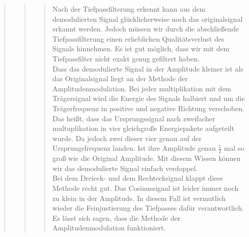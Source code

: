 \begin{quote}
\begin{quote}
\begin{quote}
                    Nach der Tiefpassfilterung erkennt kann aus dem demodulierten Signal glücklicherweise noch das
                    originalsignal erkannt werden. Jedoch müssen wir durch die abschließende Tiefpassfilterung einen
                    erheblichen Qualitätsverlust des Signals hinnehmen. Es ist gut möglich, dass wir mit dem
                    Tiefpassfilter nicht exakt genug gefiltert haben.\\
                    Dass das demodulierte Signal in der Amplitude kleiner ist als das Originalsignal liegt an der
                    Methode der Amplitudenmodulation. Bei jeder multiplikation mit dem Trägersignal wird die Energie des
                    Signals halbiert und um die Trägerfrequenz in positive und negative Richtung verschoben. Das heißt,
                    dass das Ursprungssignal nach zweifacher multuplikation in vier gleichgroße Energiepakete aufgeteilt
                    wurde. Da jedoch zwei dieser vier genau auf der Ursprungsfrequenz landen. Ist ihre Amplitude genau
                    $\frac{1}{2}$ mal so groß wie die Original Amplitude. Mit diesem Wissen können wir das demodulierte
                    Signal einfach verdoppel.\\
                    Bei dem Dreieck- und dem Rechtecksignal klappt diese Methode recht gut.  Das Cosinussignal ist
                    leider immer noch zu klein in der Amplitude. In diesem Fall ist vermutlich wieder die Feinjustierung
                    des Tiefpasses dafür verantwortlich.\\
                    Es lässt sich sagen, dass die Methode der Amplitudenmodulation funktioniert.
                    		
		\end{quote}
    \end{quote}
\end{quote}




